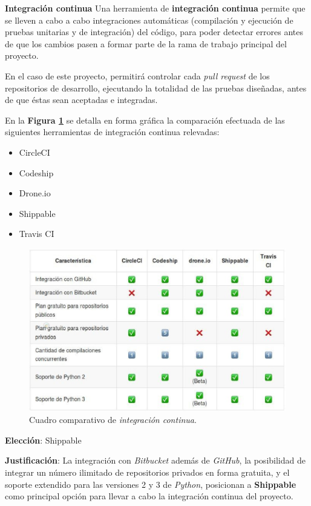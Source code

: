 \textbf{Integración continua}
	Una herramienta de \textbf{integración continua} permite que se lleven a cabo a cabo integraciones automáticas (compilación y ejecución de pruebas unitarias y de integración) del código, para poder detectar errores antes de que los cambios pasen a formar parte de la rama de trabajo principal del proyecto.

En el caso de este proyecto, permitirá controlar cada \textit{pull request} de los repositorios de desarrollo, ejecutando la totalidad de las pruebas diseñadas, antes de que éstas sean aceptadas e integradas.

En la \textbf{Figura \ref{comparativaIC}} se detalla en forma gráfica la comparación efectuada de las siguientes herramientas de integración continua relevadas:
\begin{itemize}
    \item CircleCI
    \item Codeship
    \item Drone.io
    \item Shippable
    \item Travis CI
\end{itemize}


\begin{figure}
  \centering
\includegraphics[width=1\textwidth]{img/tp2_definicion/integContinua}
  \caption{Cuadro comparativo de \textit{integración continua}.}
  \label{comparativaIC}
\end{figure}

\textbf{Elección}: Shippable

\textbf{Justificación}:
La integración con \textit{Bitbucket} además de \textit{GitHub}, la posibilidad de integrar un número ilimitado de repositorios privados en forma gratuita, y el soporte extendido para las versiones 2 y 3 de \textit{Python}, posicionan a \textbf{Shippable} como principal opción para llevar a cabo la integración continua del proyecto.


